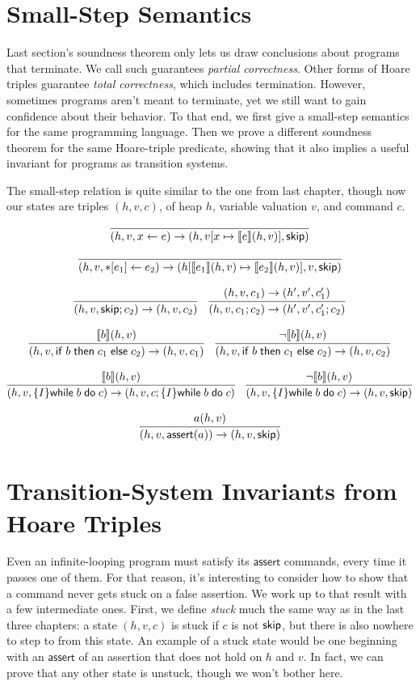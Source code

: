 \documentclass{amsbook}
\theoremstyle{definition}
\theoremstyle{remark}
\numberwithin{section}{chapter}
\numberwithin{equation}{chapter}
\begin{document}
\section{Small-Step Semantics}

Last section's soundness theorem only lets us draw conclusions about programs that terminate.
We call such guarantees \emph{partial correctness}.
Other forms of Hoare triples guarantee \emph{total correctness}, which includes termination.
However, sometimes programs aren't meant to terminate, yet we still want to gain confidence about their behavior.
To that end, we first give a small-step semantics for the same programming language.
Then we prove a different soundness theorem for the same Hoare-triple predicate, showing that it also implies a useful invariant for programs as transition systems.

The small-step relation is quite similar to the one from last chapter, though now our states are triples $(h, v, c)$, of heap $h$, variable valuation $v$, and command $c$.

\encoding
$$\infer{\smallstep{(h, v, \assign{x}{e})}{(h, \mupd{v}{x}{\denote{e}(h, v)}, \skipe)}}{}$$

$$\infer{\smallstep{(h, v, \writeto{e_1}{e_2})}{(\mupd{h}{\denote{e_1}(h, v)}{\denote{e_2}(h, v)}, v, \skipe)}}{}$$

$$\infer{\smallstep{(h, v, \skipe; c_2)}{(h, v, c_2)}}{}
\quad \infer{\smallstep{(h, v, c_1; c_2)}{(h', v', c'_1; c_2)}}{
  \smallstep{(h, v, c_1)}{(h', v', c'_1)}
}$$

$$\infer{\smallstep{(h, v, \ifte{b}{c_1}{c_2})}{(h, v, c_1)}}{
  \denote{b}(h, v)
}
\quad \infer{\smallstep{(h, v, \ifte{b}{c_1}{c_2})}{(h, v, c_2)}}{
  \neg \denote{b}(h, v)
}$$

$$\infer{\smallstep{(h, v, \{I\} \while{b}{c})}{(h, v, c; \{I\} \while{b}{c})}}{
  \denote{b}(h, v)
}
\quad \infer{\smallstep{(h, v, \{I\} \while{b}{c})}{(h, v, \skipe)}}{
  \neg \denote{b}(h, v)
}$$

$$\infer{\smallstep{(h, v, \assert{a})}{(h, v, \skipe)}}{
  a(h, v)
}$$


\section{Transition-System Invariants from Hoare Triples}

Even an infinite-looping program must satisfy its $\mathsf{assert}$ commands, every time it passes one of them.
For that reason, it's interesting to consider how to show that a command never gets stuck on a false assertion.
We work up to that result with a few intermediate ones.
First, we define \emph{stuck} much the same way as in the last three chapters: a state $(h, v, c)$ is stuck if $c$ is not $\mathsf{skip}$, but there is also nowhere to step to from this state.
An example of a stuck state would be one beginning with an $\mathsf{assert}$ of an assertion that does not hold on $h$ and $v$.
In fact, we can prove that any other state is unstuck, though we won't bother here.
\end{document}
